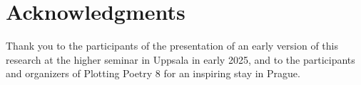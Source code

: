 \documentclass[twoside]{article}
\begin{document}
\section*{Acknowledgments}
Thank you to the participants of the presentation of an early version of this research at the higher seminar in Uppsala in early 2025, and to the participants and organizers of Plotting Poetry 8 for an inspiring stay in Prague.

\printbibliography
\end{document}

